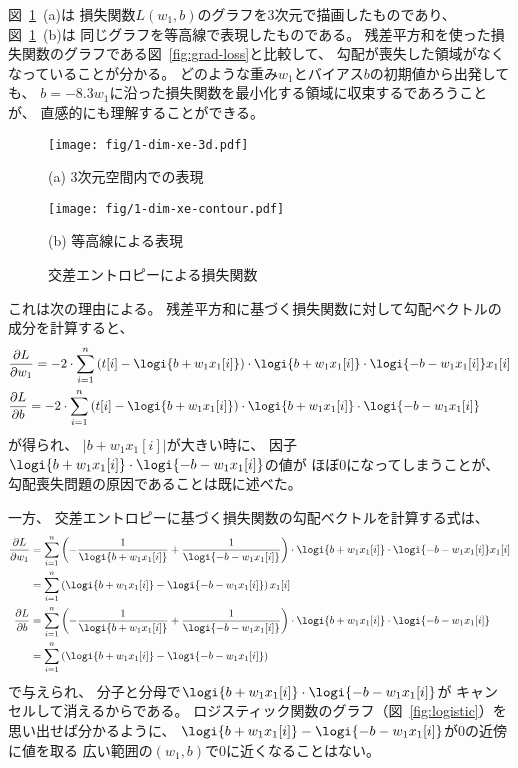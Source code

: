 図~\ref{fig:x-entropy-weight-bias}~(a)は
損失関数$L(w_1, b)$のグラフを3次元で描画したものであり、
図~\ref{fig:x-entropy-weight-bias}~(b)は
同じグラフを等高線で表現したものである。
残差平方和を使った損失関数のグラフである図~\ref{fig:grad-loss}と比較して、
勾配が喪失した領域がなくなっていることが分かる。
どのような重み$w_1$とバイアス$b$の初期値から出発しても、
$b = - 8.3 w_1$に沿った損失関数を最小化する領域に収束するであろうことが、
直感的にも理解することができる。

\begin{figure}
  \centering
    \texttt{[image: fig/1-dim-xe-3d.pdf]}

    (a) 3次元空間内での表現
    \vspace{5mm}

    \texttt{[image: fig/1-dim-xe-contour.pdf]}
    
    (b) 等高線による表現

  \caption{交差エントロピーによる損失関数}
\label{fig:x-entropy-weight-bias}
\end{figure}

これは次の理由による。
残差平方和に基づく損失関数に対して勾配ベクトルの成分を計算すると、
\begin{align*}
  &
    \frac{\partial L}{\partial w_1}
    = -2\cdot \sum_{i=1}^n \left(t[i] -
    \logi{b + w_1 x_1[i]}\right)\cdot
    \logi{b + w_1 x_1[i]}\cdot \logi{- b - w_1 x_1[i]}x_1[i]
  \\&
  \frac{\partial L}{\partial b}
    = -2\cdot \sum_{i=1}^n \left(t[i] -
    \logi{b + w_1 x_1[i]}\right)\cdot
    \logi{b + w_1 x_1[i]}\cdot \logi{- b - w_1 x_1[i]}
\end{align*}
が得られ、
$\left\vert b + w_1 x_1[i]\right\vert$が大きい時に、
因子$\logi{b + w_1 x_1[i]}\cdot \logi{- b - w_1 x_1[i]}$の値が
ほぼ0になってしまうことが、
勾配喪失問題の原因であることは既に述べた。

一方、
交差エントロピーに基づく損失関数の勾配ベクトルを計算する式は、
\begin{align*}
    \frac{\partial L}{\partial w_1}
  &
    =  \sum_{i=1}^n \left(- \frac 1{\logi{b + w_1 x_1[i]}}
    + \frac 1{\logi{- b - w_1 x_1[i]}}\right)\cdot
    \logi{b + w_1 x_1[i]}\cdot \logi{- b - w_1 x_1[i]}x_1[i]
  \\&
    =  \sum_{i=1}^n \left(\logi{b + w_1 x_1[i]}
  - \logi{- b - w_1 x_1[i]}\right) x_1[i]
  \\
  \frac{\partial L}{\partial b}
  &
    =  \sum_{i=1}^n \left(- \frac 1{\logi{b + w_1 x_1[i]}}
    + \frac 1{\logi{- b - w_1 x_1[i]}}\right)\cdot
    \logi{b + w_1 x_1[i]}\cdot \logi{- b - w_1 x_1[i]}  
  \\&
    =  \sum_{i=1}^n \left(\logi{b + w_1 x_1[i]}
  - \logi{- b - w_1 x_1[i]}\right)
\end{align*}
で与えられ、
分子と分母で$\logi{b + w_1 x_1[i]}\cdot \logi{- b - w_1 x_1[i]}$が
キャンセルして消えるからである。
ロジスティック関数のグラフ（図~\ref{fig:logistic}）を思い出せば分かるように、
$\logi{b + w_1 x_1[i]} - \logi{- b - w_1 x_1[i]}$が0の近傍に値を取る
広い範囲の$(w_1, b)$で0に近くなることはない。

